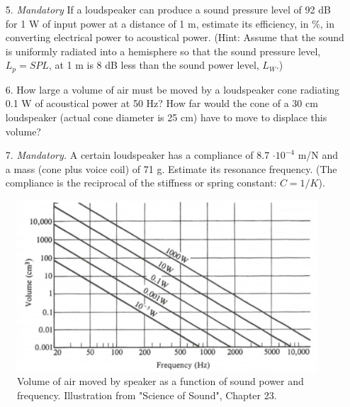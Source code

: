 \documentclass{article}
\begin{document}
\begin{itemize}
    \item[5.] \textit{Mandatory} If a loudspeaker can produce a sound pressure level of 92 dB for 1 W of input power at a distance of 1 m, estimate its efficiency, in $\%$, in converting electrical power to acoustical power. (Hint: Assume that the sound is uniformly radiated into a hemisphere so that the sound pressure level, $L_p = SPL$, at 1 m is 8 dB less than the sound power level, $L_W$.)

    
    \item[6.] How large a volume of air must be moved by a loudspeaker cone radiating 0.1 W of acoustical power at 50 Hz? How far would the cone of a 30 cm loudspeaker (actual cone diameter is 25 cm) have to move to displace this volume?
    
    \item[7.] \textit{Mandatory.} A certain loudspeaker has a compliance of 8.7 $\cdot 10^{-4}$ m/N and a mass (cone plus voice coil) of 71 g. Estimate its resonance frequency. (The compliance is the reciprocal of the stiffness or spring constant: $C=1/K$).
    

\end{itemize}


\begin{figure}[H]
    \centering
    \includegraphics[scale=0.7]{figures/oving3_1.png}
    \caption{Volume of air moved by speaker as a function of sound power and frequency. Illustration from "Science of Sound", Chapter 23.}
    \label{fig:abs}
\end{figure}
\end{document}
